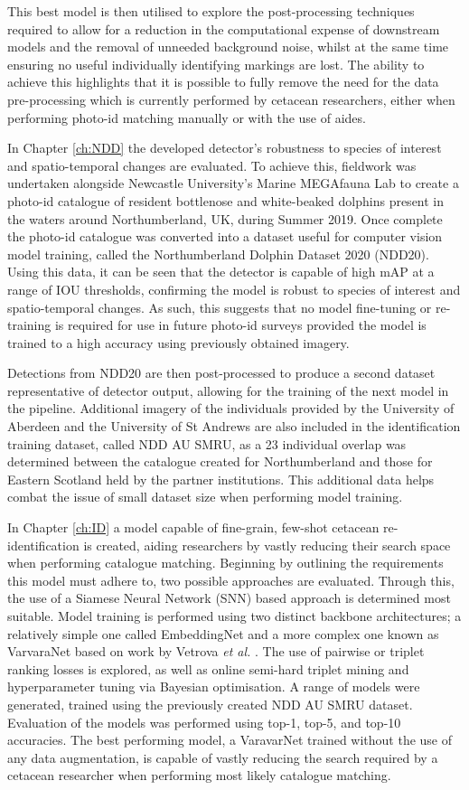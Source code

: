 This best model is then utilised to explore the post-processing techniques required to allow for a reduction in the computational expense of downstream models and the removal of unneeded background noise, whilst at the same time ensuring no useful individually identifying markings are lost. The ability to achieve this highlights that it is possible to fully remove the need for the data pre-processing which is currently performed by cetacean researchers, either when performing photo-id matching manually or with the use of aides.

In Chapter \ref{ch:NDD} the developed detector's robustness to species of interest and spatio-temporal changes are evaluated. To achieve this, fieldwork was undertaken alongside Newcastle University's Marine MEGAfauna Lab to create a photo-id catalogue of resident bottlenose and white-beaked dolphins present in the waters around Northumberland, UK, during Summer 2019. Once complete the photo-id catalogue was converted into a dataset useful for computer vision model training, called the Northumberland Dolphin Dataset 2020 (NDD20). Using this data, it can be seen that the detector is capable of high mAP at a range of IOU thresholds, confirming the model is robust to species of interest and spatio-temporal changes. As such, this suggests that no model fine-tuning or re-training is required for use in future photo-id surveys provided the model is trained to a high accuracy using previously obtained imagery. 

Detections from NDD20 are then post-processed to produce a second dataset representative of detector output, allowing for the training of the next model in the pipeline. Additional imagery of the individuals provided by the University of Aberdeen and the University of St Andrews are also included in the identification training dataset, called NDD AU SMRU, as a 23 individual overlap was determined between the catalogue created for Northumberland and those for Eastern Scotland held by the partner institutions. This additional data helps combat the issue of small dataset size when performing model training. 

In Chapter \ref{ch:ID} a model capable of fine-grain, few-shot cetacean re-identification is created, aiding researchers by vastly reducing their search space when performing catalogue matching. Beginning by outlining the requirements this model must adhere to, two possible approaches are evaluated. Through this, the use of a Siamese Neural Network (SNN) based approach is determined most suitable. Model training is performed using two distinct backbone architectures; a relatively simple one called EmbeddingNet and a more complex one known as VarvaraNet based on work by Vetrova \textit{et al.} \cite{vetrova_hidden_2018}. The use of pairwise or triplet ranking losses is explored, as well as online semi-hard triplet mining and hyperparameter tuning via Bayesian optimisation. A range of models were generated, trained using the previously created NDD AU SMRU dataset. Evaluation of the models was performed using top-1, top-5, and top-10 accuracies. The best performing model, a VaravarNet trained without the use of any data augmentation, is capable of vastly reducing the search required by a cetacean researcher when performing most likely catalogue matching. 


